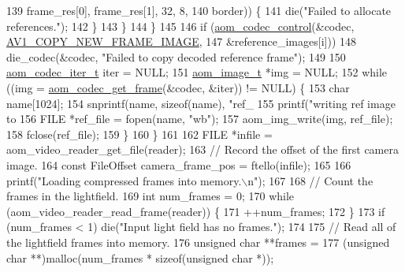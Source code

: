 \begin{DoxyCodeInclude}
{{{{139                                        frame\_res[0], frame\_res[1], 32, 8,
140                                        border)) \{
141           die(\textcolor{stringliteral}{"Failed to allocate references."});
142         \}
143       \}
144     \}
145 
146     \textcolor{keywordflow}{if} (\hyperlink{group__codec_ga6da974f4eeaba1fa74106b28d0fe6ac5}{aom\_codec\_control}(&codec, \hyperlink{group__aom_gga9421a1fa78c0d9587ae5aa6c1cb3d659ae41763622ee33cd99e23ca8f78a3f8fa}{AV1\_COPY\_NEW\_FRAME\_IMAGE},
147                           &reference\_images[i]))
148       die\_codec(&codec, \textcolor{stringliteral}{"Failed to copy decoded reference frame"});
149 
150     \hyperlink{group__codec_gadf9e173c9e02788a9999399edab20a02}{aom\_codec\_iter\_t} iter = NULL;
151     \hyperlink{structaom__image}{aom\_image\_t} *img = NULL;
152     \textcolor{keywordflow}{while} ((img = \hyperlink{group__decoder_ga780aad27a2728abefab725faa3bc4f79}{aom\_codec\_get\_frame}(&codec, &iter)) != NULL) \{
153       \textcolor{keywordtype}{char} name[1024];
154       snprintf(name, \textcolor{keyword}{sizeof}(name), \textcolor{stringliteral}{"ref\_%
155       printf(\textcolor{stringliteral}{"writing ref image to %
156       FILE *ref\_file = fopen(name, \textcolor{stringliteral}{"wb"});
157       aom\_img\_write(img, ref\_file);
158       fclose(ref\_file);
159     \}
160   \}
161 
162   FILE *infile = aom\_video\_reader\_get\_file(reader);
163   \textcolor{comment}{// Record the offset of the first camera image.}
164   \textcolor{keyword}{const} FileOffset camera\_frame\_pos = ftello(infile);
165 
166   printf(\textcolor{stringliteral}{"Loading compressed frames into memory.\(\backslash\)n"});
167 
168   \textcolor{comment}{// Count the frames in the lightfield.}
169   \textcolor{keywordtype}{int} num\_frames = 0;
170   \textcolor{keywordflow}{while} (aom\_video\_reader\_read\_frame(reader)) \{
171     ++num\_frames;
172   \}
173   \textcolor{keywordflow}{if} (num\_frames < 1) die(\textcolor{stringliteral}{"Input light field has no frames."});
174 
175   \textcolor{comment}{// Read all of the lightfield frames into memory.}
176   \textcolor{keywordtype}{unsigned} \textcolor{keywordtype}{char} **frames =
177       (\textcolor{keywordtype}{unsigned} \textcolor{keywordtype}{char} **)malloc(num\_frames * \textcolor{keyword}{sizeof}(\textcolor{keywordtype}{unsigned} \textcolor{keywordtype}{char} *));
}}}}}}
\end{DoxyCodeInclude}
